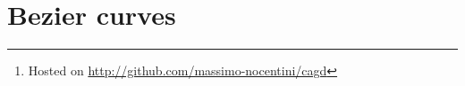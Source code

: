 \documentclass{article}
\begin{document}
\title{\rmfamily\normalfont{}}

\author{}
\date{\today}

\maketitle


\begin{abstract}
  This document contains some exercises and collects my work done during
  the CAGD course given by Prof. Alessandra Sestini and Prof. Costanza
  Conti at University of Florence.

  In particular, this document collect exercises requested by Prof.
  Costanza Conti about Bezier and BSplines curves. We implement numerical
  methods using Julia  language \cite{Julia} and everything (code for
  solving exercises and \TeX sources of this document) is under
  version control, available as open source Git repository
  \footnote{Hosted on \url{http://github.com/massimo-nocentini/cagd}},
  under \emph{MIT License}.
\end{abstract}

\tableofcontents

\newpage

\section{Bezier curves}
\end{document}
